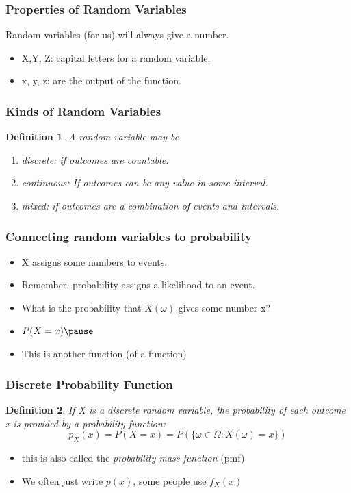 \documentclass{beamer}
\newtheorem{defn}{Definition}
\numberwithin{equation}{section}
\begin{document}
\begin{frame}
\frametitle{Properties of Random Variables}

Random variables (for us) will always give a number.
\begin{itemize}
\item X,Y, Z: capital letters for a random variable.
\item x, y, z: are the output of the function.
\end{itemize}
\end{frame}


\begin{frame}
\frametitle{Kinds of Random Variables}
\begin{defn}
A random variable may be 
\begin{enumerate}
\item discrete: if outcomes are countable.
\item continuous: If outcomes can be any value in some interval.
\item mixed: if outcomes are a combination of events and intervals.
\end{enumerate}
\end{defn}
\end{frame}


\begin{frame}
\frametitle{Connecting random variables to probability}
\begin{itemize}
\item X assigns some numbers to events.\pause
\item Remember, probability assigns a likelihood to an event.\pause
\item What is the probability that $X(\omega)$ gives some number x?\pause
\item $P(X=x)\pause $
\item This is another function (of a function)
\end{itemize}
\end{frame}


\begin{frame}
\frametitle{Discrete Probability Function}
\begin{defn}

If X is a discrete random variable, the probability of each outcome x is provided by a probability function:
$$p_X(x)=P(X=x)=P(\{\omega \in \Omega: X(\omega)=x\})$$

\end{defn}
\begin{itemize}
\item this is also called the \emph{probability mass function} (pmf)
\item We often just write $p(x)$, some people use $f_X(x)$
\end{itemize}

\end{frame}
\end{document}
